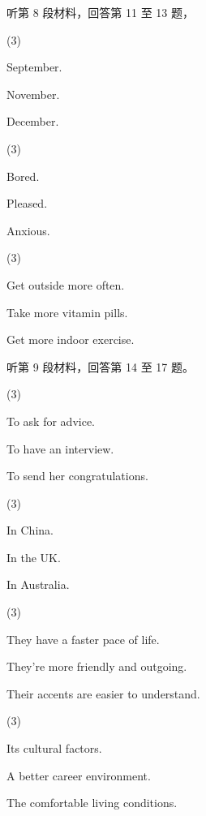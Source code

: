 \documentclass{英语试卷}
\begin{document}
\par 听第 8 段材料，回答第 11 至 13 题，\par
{}
\begin{choices}(3)
  \item September.
  \item November.
  \item December.
\end{choices}
\begin{choices}(3)
  \item Bored.
  \item Pleased.
  \item Anxious.
\end{choices}
\begin{choices}(3)
  \item Get outside more often.
  \item Take more vitamin pills.
  \item Get more indoor exercise.
\end{choices}
\par 听第 9 段材料，回答第 14 至 17 题。\par
{}
\begin{choices}(3)
  \item To ask for advice.
  \item To have an interview.
  \item To send her congratulations.
\end{choices}
\begin{choices}(3)
  \item In China.
  \item In the UK.
  \item In Australia.
\end{choices}
\begin{choices}(3)
  \item They have a faster pace of life.
  \item They're more friendly and outgoing.
  \item Their accents are easier to understand.
\end{choices}
\begin{choices}(3)
  \item Its cultural factors.
  \item A better career environment.
  \item The comfortable living conditions.
\end{choices}
\end{document}

